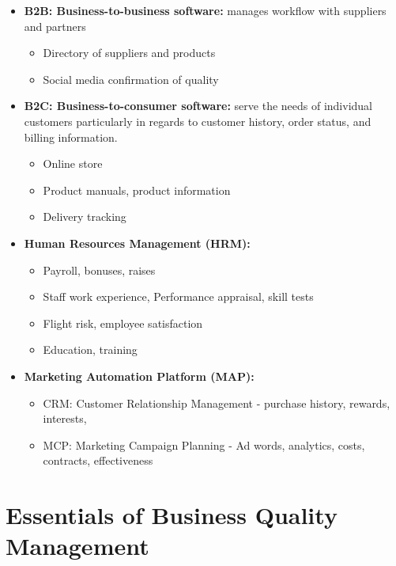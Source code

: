 \documentclass[]{book}
\providecommand{\tightlist}{%
  \setlength{\itemsep}{0pt}\setlength{\parskip}{0pt}}
\begin{document}
\begin{itemize}
\item
  \textbf{B2B: Business-to-business software:} manages workflow with suppliers and partners

  \begin{itemize}
  \tightlist
  \item
    Directory of suppliers and products
  \item
    Social media confirmation of quality
  \end{itemize}
\item
  \textbf{B2C: Business-to-consumer software:} serve the needs of individual customers particularly in regards to customer history, order status, and billing information.

  \begin{itemize}
  \tightlist
  \item
    Online store
  \item
    Product manuals, product information
  \item
    Delivery tracking
  \end{itemize}
\item
  \textbf{Human Resources Management (HRM):}

  \begin{itemize}
  \tightlist
  \item
    Payroll, bonuses, raises
  \item
    Staff work experience, Performance appraisal, skill tests
  \item
    Flight risk, employee satisfaction
  \item
    Education, training
  \end{itemize}
\item
  \textbf{Marketing Automation Platform (MAP):}

  \begin{itemize}
  \tightlist
  \item
    CRM: Customer Relationship Management - purchase history, rewards, interests,
  \item
    MCP: Marketing Campaign Planning - Ad words, analytics, costs, contracts, effectiveness
  \end{itemize}
\end{itemize}

\hypertarget{essentials-of-business-quality-management}{%
\section{Essentials of Business Quality Management}\label{essentials-of-business-quality-management}}
\end{document}
